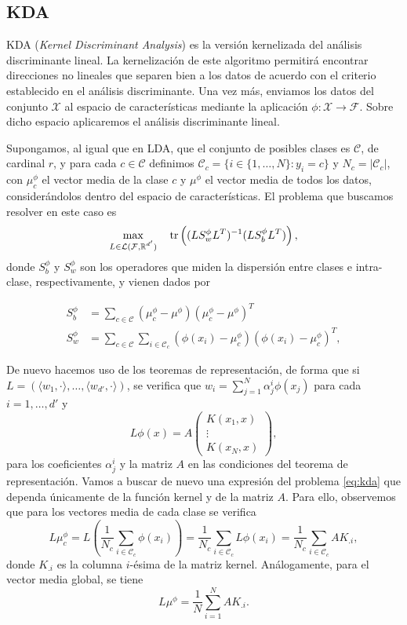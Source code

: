 \subsection{KDA}

KDA (\emph{Kernel Discriminant Analysis}) \cite{kda} es la versión kernelizada del análisis discriminante lineal. La kernelización de este algoritmo permitirá encontrar direcciones no lineales que separen bien a los datos de acuerdo con el criterio establecido en el análisis discriminante. Una vez más, enviamos los datos del conjunto $\mathcal{X}$ al espacio de características mediante la aplicación $\phi \colon \mathcal{X} \to \mathcal{F}$. Sobre dicho espacio aplicaremos el análisis discriminante lineal.

Supongamos, al igual que en LDA, que el conjunto de posibles clases es $\mathcal{C}$, de cardinal $r$, y para cada $c \in \mathcal{C}$ definimos $\mathcal{C}_c = \{i \in \{1,\dots,N\} \colon y_i = c\}$ y $N_c = |\mathcal{C}_c|$, con $\mu_c^{\phi}$ el vector media de la clase $c$ y $\mu^{\phi}$ el vector media de todos los datos, considerándolos dentro del espacio de características. El problema que buscamos resolver en este caso es
\begin{equation} \label{eq:kda}
    \max_{\substack{L \in \mathcal{L}(\mathcal{F}, \mathbb{R}^{d'}) }} \quad \operatorname{tr}\left((L S_w^{\phi} L^T)^{-1} (LS_b^{\phi}L^T)\right),
\end{equation}
donde $S_b^{\phi}$ y $S_w^{\phi}$ son los operadores que miden la dispersión entre clases e intra-clase, respectivamente, y vienen dados por

\begin{align*}
    S_b^{\phi} &= \sum_{c \in \mathcal{C}}(\mu_c^{\phi} - \mu^{\phi})(\mu_c^{\phi} - \mu^{\phi})^T \\
    S_w^{\phi} &= \sum_{c \in \mathcal{C}}\sum_{i \in \mathcal{C}_c}(\phi(x_i)-\mu_c^{\phi})(\phi(x_i)-\mu_c^{\phi})^T,
\end{align*}

De nuevo hacemos uso de los teoremas de representación, de forma que si $L = (\langle w_1,\cdot\rangle, \dots, \langle w_{d'}, \cdot \rangle)$, se verifica que $w_i = \sum_{j=1}^N \alpha_j^i \phi(x_j)$ para cada $i = 1,\dots,d'$ y
\[L\phi(x) = A \begin{pmatrix} K(x_1,x) \\ \vdots \\ K(x_N,x) \end{pmatrix}, \]
para los coeficientes $\alpha_j^i$ y la matriz $A$ en las condiciones del teorema de representación. Vamos a buscar de nuevo una expresión del problema \ref{eq:kda} que dependa únicamente de la función kernel y de la matriz $A$. Para ello, observemos que para los vectores media de cada clase se verifica
\[ L\mu_c^{\phi} = L\left(\frac{1}{N_c} \sum_{i \in \mathcal{C}_c} \phi(x_i)\right) = \frac{1}{N_c}\sum_{i \in \mathcal{C}_c}L\phi(x_i) = \frac{1}{N_c}\sum_{i \in \mathcal{C}_c}AK_{.i},  \]
donde $K_{.i}$ es la columna $i$-ésima de la matriz kernel. Análogamente, para el vector media global, se tiene
\[ L\mu^{\phi} = \frac{1}{N} \sum_{i=1}^NAK_{.i}. \]

